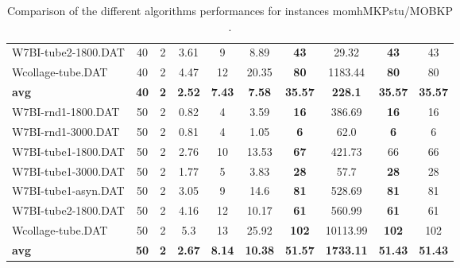\begin{table}[h]
\begin{tabular}{lccccccccc}
W7BI-tube2-1800.DAT & 40 & 2 &  \textcolor{blue2}{3.61} & 9 & 8.89 &  \textbf{43} & 29.32 &  \textbf{43}  & 43 \\
Wcollage-tube.DAT & 40 & 2 &  \textcolor{blue2}{4.47} & 12 & 20.35 &  \textbf{80} & 1183.44 &  \textbf{80}  & 80 \\
\cline{1-10} \textbf{avg} & \textbf{40} & \textbf{2} & \textbf{2.52} & \textbf{7.43} & \textbf{7.58} & \textbf{35.57} & \textbf{228.1} & \textbf{35.57} & \textbf{35.57} \\ \cline{1-10}
W7BI-rnd1-1800.DAT & 50 & 2 &  \textcolor{blue2}{0.82} & 4 & 3.59 &  \textbf{16} & 386.69 &  \textbf{16}  & 16 \\
W7BI-rnd1-3000.DAT & 50 & 2 &  \textcolor{blue2}{0.81} & 4 & 1.05 &  \textbf{6} & 62.0 &  \textbf{6}  & 6 \\
W7BI-tube1-1800.DAT & 50 & 2 &  \textcolor{blue2}{2.76} & 10 & 13.53 &  \textbf{67} & 421.73 & 66  & 66 \\
W7BI-tube1-3000.DAT & 50 & 2 &  \textcolor{blue2}{1.77} & 5 & 3.83 &  \textbf{28} & 57.7 &  \textbf{28}  & 28 \\
W7BI-tube1-asyn.DAT & 50 & 2 &  \textcolor{blue2}{3.05} & 9 & 14.6 &  \textbf{81} & 528.69 &  \textbf{81}  & 81 \\
W7BI-tube2-1800.DAT & 50 & 2 &  \textcolor{blue2}{4.16} & 12 & 10.17 &  \textbf{61} & 560.99 &  \textbf{61}  & 61 \\
Wcollage-tube.DAT & 50 & 2 &  \textcolor{blue2}{5.3} & 13 & 25.92 &  \textbf{102} & 10113.99 &  \textbf{102}  & 102 \\
\cline{1-10} \textbf{avg} & \textbf{50} & \textbf{2} & \textbf{2.67} & \textbf{8.14} & \textbf{10.38} & \textbf{51.57} & \textbf{1733.11} & \textbf{51.43} & \textbf{51.43} \\ \cline{1-10}
\bottomrule
\end{tabular}
\caption{Comparison of the different algorithms performances for instances momhMKPstu/MOBKP .}
\label{tab:table_compare_momhMKPstu/MOBKP }
\end{table}
